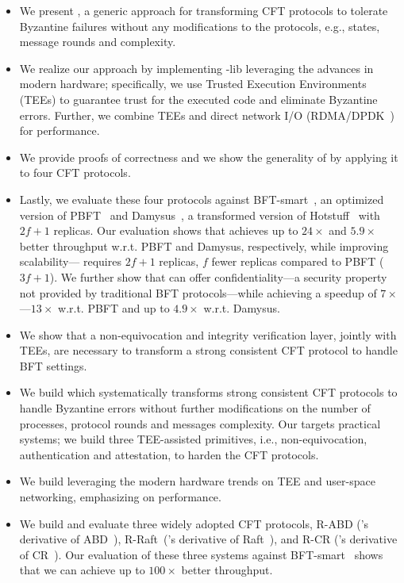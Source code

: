 \begin{itemize}
    \item We present \projecttitle{}, a generic approach for transforming CFT protocols to tolerate Byzantine failures without any modifications to the protocols, e.g., states, message rounds and complexity.
    \item We realize our approach by implementing \projecttitle{}-lib leveraging the advances in modern hardware; specifically, we use Trusted Execution Environments (TEEs) to guarantee trust for the executed code and eliminate Byzantine errors. Further, we combine TEEs and direct network I/O (RDMA/DPDK~\cite{rdma, dpdk}) for performance.
    \item We provide proofs of correctness and we show the generality of \projecttitle{} by applying it to four CFT protocols.
    \item Lastly, we evaluate these four protocols against BFT-smart~\cite{bft-smart}, an optimized version of PBFT~\cite{Castro:2002} and Damysus~\cite{10.1145/3492321.3519568}, a transformed  version of Hotstuff~\cite{DBLP:journals/corr/abs-1803-05069} with $2f+1$ replicas. Our evaluation shows that \projecttitle{} achieves up to $24\times$ and $5.9\times$ better throughput w.r.t. PBFT and Damysus, respectively, while improving scalability---\projecttitle{} requires $2f+1$ replicas, $f$ fewer replicas compared to PBFT ($3f+1$). We further show that \projecttitle{} can offer confidentiality---a security property not provided by traditional BFT protocols---while achieving a speedup of $7\times$---$13\times$ w.r.t. PBFT and up to $4.9\times$ w.r.t. Damysus.
\end{itemize}


\begin{itemize}
    \item We show that a non-equivocation and integrity verification layer, jointly with TEEs, are necessary to transform a strong consistent CFT protocol to handle BFT settings. 
    \item We build \projecttitle{} which systematically transforms strong consistent CFT protocols to handle Byzantine errors without further modifications on the number of processes, protocol rounds and messages complexity. Our \projecttitle{} targets practical systems; we build three TEE-assisted primitives, i.e., non-equivocation, authentication and attestation, to harden the CFT protocols.
    \item We build \projecttitle{} leveraging the modern hardware trends on TEE and user-space networking, emphasizing on performance.
    \item We build and evaluate three widely adopted CFT protocols, R-ABD (\projecttitle{}'s derivative of ABD~\cite{lynch:1997}), R-Raft~\cite{raft}(\projecttitle{}'s derivative of Raft~\cite{raft}), and R-CR (\projecttitle{}'s derivative of CR~\cite{chain-replication}). Our evaluation of these three systems against BFT-smart~\cite{bft-smart} shows that we can achieve up to $100\times$ better throughput.
\end{itemize}

